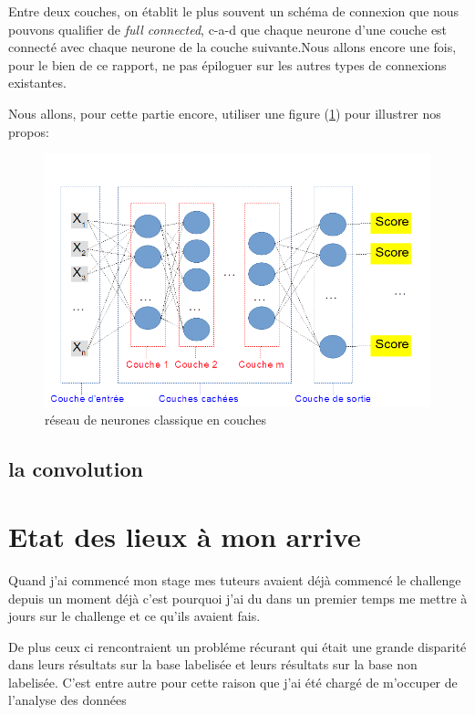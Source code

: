Entre deux couches, on établit le plus souvent un schéma de connexion que nous pouvons qualifier de \textit{full connected}, c-a-d que chaque neurone d'une couche est connecté avec chaque neurone de la couche suivante.Nous allons encore une fois, pour le bien de ce rapport, ne pas épiloguer sur les autres types de connexions existantes.\newline

Nous allons, pour cette partie encore, utiliser une figure (\ref{reseauClassique}) pour illustrer nos propos:

\begin{figure}[h]
\includegraphics[width=16.5cm]{./images/multicouche.png}
\caption{réseau de neurones classique en couches}
\label{reseauClassique}
\end{figure}

\subsection{la convolution}
\label{la convolution}

\section{Etat des lieux à mon arrive}
\label{Etat des lieux à mon arrivé}

Quand j'ai commencé mon stage mes tuteurs avaient déjà commencé le challenge depuis un moment déjà c'est pourquoi j'ai du dans un premier temps me mettre à jours sur le challenge et ce qu'ils avaient fais.






De plus ceux ci rencontraient un probléme récurant qui était une grande disparité dans leurs résultats sur la base labelisée et leurs résultats sur la base non labelisée.
C'est entre autre pour cette raison que j'ai été chargé de m'occuper de l'analyse des données


